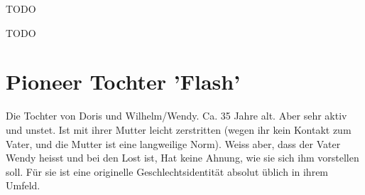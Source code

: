\begin{npcBox}[title=Doris]
    \begin{stressSection}
    \end{stressSection}
    \begin{tabularx}{\textwidth}{ XX }
    \end{tabularx}

    \begin{consequences}
    \item {}
    \item {}
    \item {}
    \end{consequences}

    \begin{npcDescription}
    TODO
    \end{npcDescription}


    \begin{equipment}
    \item TODO
    \end{equipment}
\end{npcBox}
\newpage

\section{Pioneer Tochter 'Flash'}

Die Tochter von Doris und Wilhelm/Wendy. Ca. 35 Jahre alt. Aber sehr aktiv und unstet. Ist mit ihrer Mutter leicht zerstritten (wegen ihr kein Kontakt zum Vater, und die Mutter ist eine langweilige Norm). Weiss aber, dass der Vater Wendy heisst und bei den Lost ist, Hat keine Ahnung, wie sie sich ihm vorstellen soll. Für sie ist eine originelle Geschlechtsidentität absolut üblich in ihrem Umfeld.

